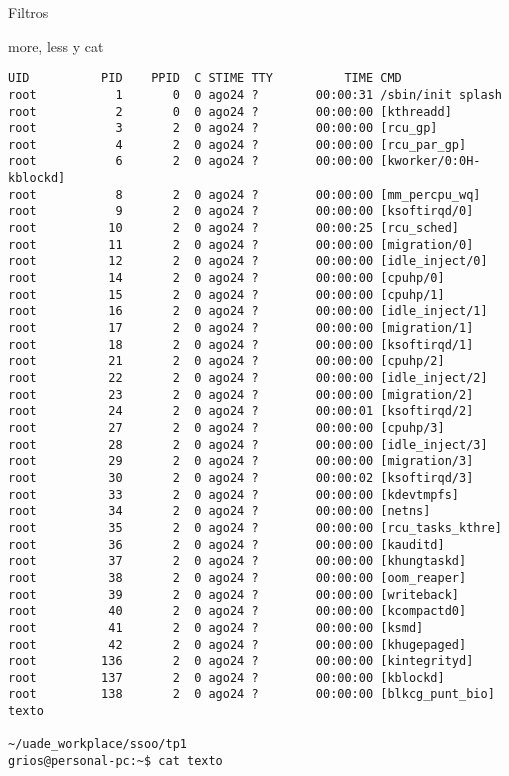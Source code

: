 \begin{section}{Filtros}
\begin{subsection}{more, less y cat}
\begin{lstlisting}[style=Ubuntu]
UID          PID    PPID  C STIME TTY          TIME CMD
root           1       0  0 ago24 ?        00:00:31 /sbin/init splash
root           2       0  0 ago24 ?        00:00:00 [kthreadd]
root           3       2  0 ago24 ?        00:00:00 [rcu_gp]
root           4       2  0 ago24 ?        00:00:00 [rcu_par_gp]
root           6       2  0 ago24 ?        00:00:00 [kworker/0:0H-kblockd]
root           8       2  0 ago24 ?        00:00:00 [mm_percpu_wq]
root           9       2  0 ago24 ?        00:00:00 [ksoftirqd/0]
root          10       2  0 ago24 ?        00:00:25 [rcu_sched]
root          11       2  0 ago24 ?        00:00:00 [migration/0]
root          12       2  0 ago24 ?        00:00:00 [idle_inject/0]
root          14       2  0 ago24 ?        00:00:00 [cpuhp/0]
root          15       2  0 ago24 ?        00:00:00 [cpuhp/1]
root          16       2  0 ago24 ?        00:00:00 [idle_inject/1]
root          17       2  0 ago24 ?        00:00:00 [migration/1]
root          18       2  0 ago24 ?        00:00:00 [ksoftirqd/1]
root          21       2  0 ago24 ?        00:00:00 [cpuhp/2]
root          22       2  0 ago24 ?        00:00:00 [idle_inject/2]
root          23       2  0 ago24 ?        00:00:00 [migration/2]
root          24       2  0 ago24 ?        00:00:01 [ksoftirqd/2]
root          27       2  0 ago24 ?        00:00:00 [cpuhp/3]
root          28       2  0 ago24 ?        00:00:00 [idle_inject/3]
root          29       2  0 ago24 ?        00:00:00 [migration/3]
root          30       2  0 ago24 ?        00:00:02 [ksoftirqd/3]
root          33       2  0 ago24 ?        00:00:00 [kdevtmpfs]
root          34       2  0 ago24 ?        00:00:00 [netns]
root          35       2  0 ago24 ?        00:00:00 [rcu_tasks_kthre]
root          36       2  0 ago24 ?        00:00:00 [kauditd]
root          37       2  0 ago24 ?        00:00:00 [khungtaskd]
root          38       2  0 ago24 ?        00:00:00 [oom_reaper]
root          39       2  0 ago24 ?        00:00:00 [writeback]
root          40       2  0 ago24 ?        00:00:00 [kcompactd0]
root          41       2  0 ago24 ?        00:00:00 [ksmd]
root          42       2  0 ago24 ?        00:00:00 [khugepaged]
root         136       2  0 ago24 ?        00:00:00 [kintegrityd]
root         137       2  0 ago24 ?        00:00:00 [kblockd]
root         138       2  0 ago24 ?        00:00:00 [blkcg_punt_bio]
texto

~/uade_workplace/ssoo/tp1
grios@personal-pc:~$ cat texto


\end{lstlisting}
\end{subsection}
\end{section}
